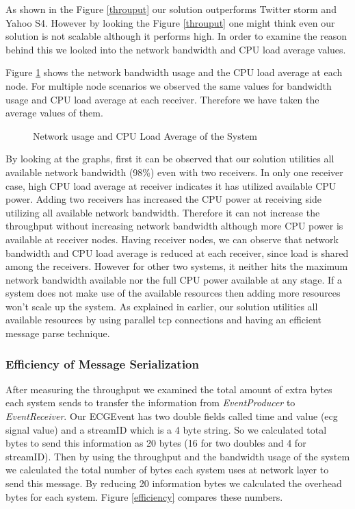 As shown in the Figure \ref{throuput} our solution outperforms Twitter storm\cite{twitterStorm} and Yahoo S4\cite{neumeyer2010s4}. However by looking the Figure \ref{throuput} one might think even our solution is not scalable although it performs high. In order to examine the reason behind this we looked into the network bandwidth and CPU load average values. 
 
Figure \ref{networkandload} shows the network bandwidth usage and the CPU load average at each node. For multiple node scenarios we observed the same values for bandwidth usage and CPU load average at each receiver. Therefore we have taken the average values of them. 

\begin{figure}[!t]
	\centering
	\hfil
	\caption{Network usage and CPU Load Average of the System}
	\label{networkandload}
\end{figure}
 

By looking at the graphs, first it can be observed that our solution utilities all available network bandwidth (98\%) even with two receivers. In only one receiver case, high CPU load average at receiver indicates it has utilized available CPU power. Adding two receivers has increased the CPU power at receiving side utilizing all available network bandwidth. Therefore it can not increase the throughput without increasing network bandwidth although more CPU power is available at receiver nodes. Having receiver nodes, we can observe that network bandwidth and CPU load average is reduced at each receiver, since load is shared among the receivers. However for other two systems, it neither hits the maximum network bandwidth available nor the full CPU power available at any stage. If a system does not make use of the available resources then adding more resources won't scale up the system. As explained in earlier, our solution utilities all available resources by using parallel tcp connections and having an efficient 
message parse technique.

\subsubsection{Efficiency of Message Serialization}
After measuring the throughput we examined the  total amount of extra bytes each system sends to transfer the information from \textit{EventProducer} to \textit{EventReceiver}. Our ECGEvent has two double fields called time and value (ecg signal value) and a streamID which is a 4 byte string. So we calculated total bytes to send this information as 20 bytes (16 for two doubles and 4 for streamID). Then by using the throughput and the bandwidth usage of the system we calculated the total number of bytes each system uses at network layer to send this message. By reducing 20 information bytes we calculated the overhead bytes for each system. Figure \ref{efficiency} compares these numbers.

